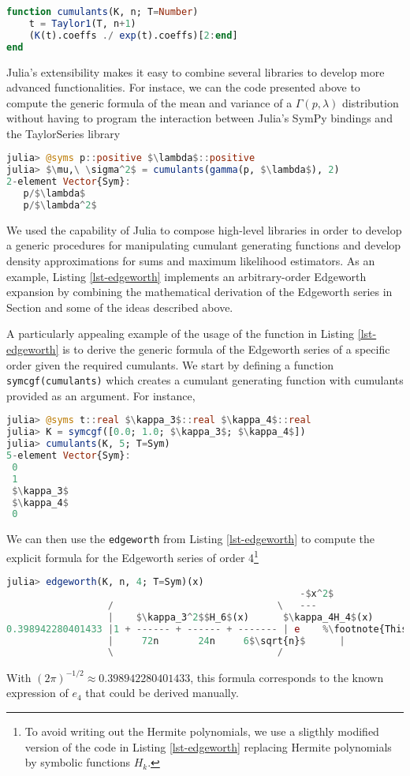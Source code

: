 \begin{lstlisting}[language=Julia, mathescape, escapechar=\%]
function cumulants(K, n; T=Number)
    t = Taylor1(T, n+1)
    (K(t).coeffs ./ exp(t).coeffs)[2:end]
end
\end{lstlisting}
Julia's extensibility makes it easy to combine several libraries to develop more advanced functionalities. For instace, we can the code presented above to compute the generic formula of the mean and variance of a $\Gamma(p, \lambda)$ distribution without having to program the interaction between Julia's SymPy bindings and the TaylorSeries library
\begin{lstlisting}[language=Julia, mathescape, escapechar=\%]
julia> @syms p::positive $\lambda$::positive
julia> $\mu,\ \sigma^2$ = cumulants(gamma(p, $\lambda$), 2)
2-element Vector{Sym}:
   p/$\lambda$
   p/$\lambda^2$
\end{lstlisting}
We used the capability of Julia to compose high-level libraries in order to develop a generic procedures for manipulating cumulant generating functions and develop density approximations for sums and maximum likelihood estimators. As an example, Listing \ref{lst-edgeworth} implements an arbitrary-order Edgeworth expansion by combining the mathematical derivation of the Edgeworth series in Section  and some of the ideas described above.

A particularly appealing example of the usage of the function in Listing \ref{lst-edgeworth} is to derive the generic formula of the Edgeworth series of a specific order given the required cumulants. We start by defining a function \lstinline{symcgf(cumulants)} which creates a cumulant generating function with cumulants provided as an argument. For instance,
\begin{lstlisting}[language=Julia, mathescape, escapechar=\%]
julia> @syms t::real $\kappa_3$::real $\kappa_4$::real
julia> K = symcgf([0.0; 1.0; $\kappa_3$; $\kappa_4$])
julia> cumulants(K, 5; T=Sym)
5-element Vector{Sym}:
 0
 1
 $\kappa_3$
 $\kappa_4$
 0
\end{lstlisting}
We can then use the \lstinline{edgeworth} from Listing \ref{lst-edgeworth} to compute the explicit formula for the Edgeworth series of order 4\footnote{To avoid writing out the Hermite polynomials, we use a sligthly modified version of the code in Listing \ref{lst-edgeworth} replacing Hermite polynomials by symbolic functions $H_k$.}
\begin{lstlisting}[language=Julia, mathescape, escapechar=\%]
julia> edgeworth(K, n, 4; T=Sym)(x)
                                                    -$x^2$  
                  /                             \   ---
                  |    $\kappa_3^2$$H_6$(x)      $\kappa_4H_4$(x)      $\kappa_3H_3$(x)     |   2  
0.398942280401433 |1 + ------ + ------ + ------- | e    %\footnote{This output was lightly adapted to properly render in LaTeX. }%
                  |     72n       24n     6$\sqrt{n}$      |      
                  \                             /    

\end{lstlisting}
With $(2\pi)^{-1/2} \approx 0.398942280401433$, this formula corresponds to the known expression of $e_4$ that could be derived manually.
\newpage

